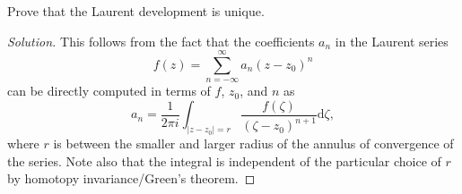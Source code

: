 \documentclass[10pt]{article}
\newcommand{\dd}{\mathrm{d}}
\newenvironment{soln}{\begin{proof}[Solution]}{\end{proof}}
\providecommand{\abs}[1]{\left\lvert #1\right\rvert}
\begin{document}
\begin{problem}
    [p.186\#1]
    Prove that the Laurent development is unique.
\end{problem}

\begin{soln}
    This follows from the fact that the coefficients
    $a_n$ in the Laurent series
    \begin{equation*}
	f(z) = \sum_{n=-\infty}^\infty a_n(z-z_0)^n
    \end{equation*}
    can be directly computed in terms of $f$, $z_0$, and $n$ as
    \begin{equation*}
	a_n = \frac 1{2\pi i}\int_{\abs{z-z_0}=r}\frac{f(\zeta)}
	{(\zeta-z_0)^{n+1}}\dd\zeta,
    \end{equation*}
    where $r$ is between the smaller and larger radius
    of the annulus of convergence of the series.
    Note also that the integral is independent of
    the particular choice of $r$ by homotopy invariance/Green's theorem.
\end{soln}
\end{document}

